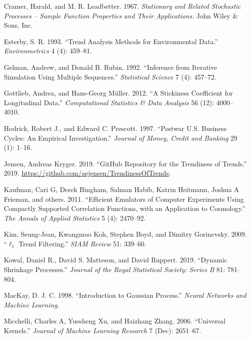 \documentclass[
  11pt,
]{article}
\theoremstyle{nonumberplain}
\begin{document}
\leavevmode\hypertarget{ref-cramer1967stationary}{}%
Cramer, Harald, and M. R. Leadbetter. 1967. \emph{Stationary and Related
Stochastic Processes -- Sample Function Properties and Their
Applications.} John Wiley \& Sons, Inc.

\leavevmode\hypertarget{ref-esterby1993trenddef}{}%
Esterby, S. R. 1993. ``Trend Analysis Methods for Environmental Data.''
\emph{Environmetrics} 4 (4): 459--81.

\leavevmode\hypertarget{ref-gelman1992inference}{}%
Gelman, Andrew, and Donald B. Rubin. 1992. ``Inference from Iterative
Simulation Using Multiple Sequences.'' \emph{Statistical Science} 7 (4):
457--72.

\leavevmode\hypertarget{ref-gottlieb2012stickiness}{}%
Gottlieb, Andrea, and Hans-Georg Müller. 2012. ``A Stickiness
Coefficient for Longitudinal Data.'' \emph{Computational Statistics \&
Data Analysis} 56 (12): 4000--4010.

\leavevmode\hypertarget{ref-hodrick1997trendfiltering}{}%
Hodrick, Robert J., and Edward C. Prescott. 1997. ``Postwar U.S.
Business Cycles: An Empirical Investigation.'' \emph{Journal of Money,
Credit and Banking} 29 (1): 1--16.

\leavevmode\hypertarget{ref-gptrendStan}{}%
Jensen, Andreas Kryger. 2019. ``GitHub Repository for the Trendiness of
Trends.'' 2019. \url{https://github.com/aejensen/TrendinessOfTrends}.

\leavevmode\hypertarget{ref-kaufman2011efficient}{}%
Kaufman, Cari G, Derek Bingham, Salman Habib, Katrin Heitmann, Joshua A
Frieman, and others. 2011. ``Efficient Emulators of Computer Experiments
Using Compactly Supported Correlation Functions, with an Application to
Cosmology.'' \emph{The Annals of Applied Statistics} 5 (4): 2470--92.

\leavevmode\hypertarget{ref-kim2009trendfiltering}{}%
Kim, Seung-Jean, Kwangmoo Koh, Stephen Boyd, and Dimitry Gorinevsky.
2009. ``\(\ell_1\) Trend Filtering.'' \emph{SIAM Review} 51: 339--60.

\leavevmode\hypertarget{ref-kowal2019dynamicshrinkage}{}%
Kowal, Daniel R., David S. Matteson, and David Ruppert. 2019. ``Dynamic
Shrinkage Processes.'' \emph{Journal of the Royal Statistical Society:
Series B} 81: 781--804.

\leavevmode\hypertarget{ref-mackay1998introduction}{}%
MacKay, D. J. C. 1998. ``Introduction to Gaussian Process.''
\emph{Neural Networks and Machine Learning}.

\leavevmode\hypertarget{ref-micchelli2006universal}{}%
Micchelli, Charles A, Yuesheng Xu, and Haizhang Zhang. 2006. ``Universal
Kernels.'' \emph{Journal of Machine Learning Research} 7 (Dec):
2651--67.
\end{document}
